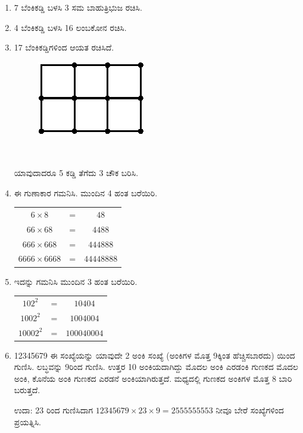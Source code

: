 \begin{enumerate}
\item 7 ಬೆಂಕಿಕಡ್ಡಿ ಬಳಸಿ 3 ಸಮ ಬಾಹುತ್ರಿಭುಜ ರಚಿಸಿ. 

\item 4 ಬೆಂಕಿಕಡ್ಡಿ ಬಳಸಿ 16 ಲಂಬಕೋನ ರಚಿಸಿ. 

\item 17 ಬೆಂಕಿಕಡ್ಡಿಗಳಿಂದ ಆಯತ ರಚಿಸಿದೆ. 
~

\vskip -0.4cm
\begin{figure}[H]
\centering
\includegraphics{images/chap9/q17.eps}
\end{figure}
~

\vskip -0.4cm

ಯಾವುದಾದರೂ 5 ಕಡ್ಡಿ ತೆಗೆದು 3 ಚೌಕ ಬರಿಸಿ. 

\item ಈ ಗುಣಾಕಾರ ಗಮನಿಸಿ. ಮುಂದಿನ 4 ಹಂತ ಬರೆಯಿರಿ. 

{\fontsize{11pt}{13pt}\selectfont
\begin{tabular}[t]{c@{\;}c@{\;}c}
$6\times 8$ & = & $48$\\
$66\times 68$ & = & $4488$\\
$666\times 668$ & = & $444888$\\
$6666\times 6668$ & = & $44448888$\\
\end{tabular}}\relax

\item ಇದನ್ನು ಗಮನಿಸಿ ಮುಂದಿನ 3 ಹಂತ ಬರೆಯಿರಿ. 

\begin{tabular}[t]{c@{\;}c@{\;}c}
$102^{2}$ & = & $10404$\\
$1002^{2}$ & = & $1004004$\\
$10002^{2}$ & = & $100040004$\\
\end{tabular}

\item 12345679 ಈ ಸಂಖ್ಯೆಯನ್ನು ಯಾವುದೇ 2 ಅಂಕಿ ಸಂಖ್ಯೆ (ಅಂಕಿಗಳ ಮೊತ್ತ 9ಕ್ಕಿಂತ ಹೆಚ್ಚಿಸಬಾರದು) ಯಿಂದ ಗುಣಿಸಿ. ಲಬ್ಧವನ್ನು 9ರಿಂದ ಗುಣಿಸಿ. ಉತ್ತರ 10 ಅಂಕಿಯದಾಗಿದ್ದು ಮೊದಲ ಅಂಕಿ ಎರಡಂಕಿ ಗುಣಕದ ಮೊದಲ ಅಂಕಿ, ಕೊನೆಯ ಅಂಕಿ ಗುಣಕದ ಎರಡನೆ ಅಂಕಿಯಾಗಿರುತ್ತದೆ. ಮಧ್ಯದಲ್ಲಿ ಗುಣಕದ ಅಂಕಿಗಳ ಮೊತ್ತ 8 ಬಾರಿ ಬರುತ್ತದೆ. 

ಉದಾ: 23 ರಿಂದ ಗುಣಿಸಿದಾಗ $12345679\times 23\times 9 = 2555555553$ ನೀವೂ ಬೇರೆ ಸಂಖ್ಯೆಗಳಿಂದ ಪ್ರಯತ್ನಿಸಿ. 


\end{enumerate}
